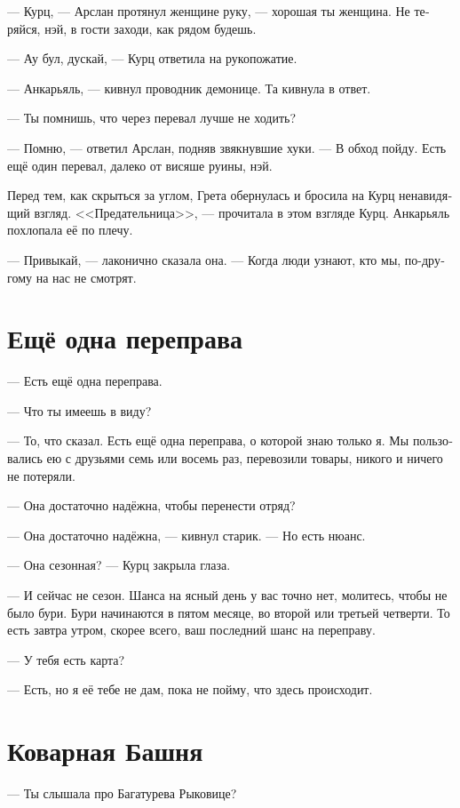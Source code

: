 \documentclass[a4paper,10pt,fleqn]{book}\usepackage{polyglossia}\setdefaultlanguage[babelshorthands=true]{russian}\setotherlanguage{english}\defaultfontfeatures{Ligatures=TeX,Mapping=tex-text}\usepackage{xcolor}\newcommand{\ml}[3]{#2}
\begin{document}
--- Курц, --- Арслан протянул женщине руку, --- хорошая ты женщина.
Не теряйся, нэй, в гости заходи, как рядом будешь.

\ml{$0$}
{--- Ау бул, дускай, --- Курц ответила на рукопожатие.}
{``\textit{Au bul, du\th{}k\ae{},}'' Kurz answered the handshake.}

--- Анкарьяль, --- кивнул проводник демонице.
Та кивнула в ответ.

--- Ты помнишь, что через перевал лучше не ходить?

--- Помню, --- ответил Арслан, подняв звякнувшие хуки.
--- В обход пойду.
Есть ещё один перевал, далеко от висяше руины, нэй.

Перед тем, как скрыться за углом, Грета обернулась и бросила на Курц ненавидящий взгляд.
<<Предательница>>, --- прочитала в этом взгляде Курц.
Анкарьяль похлопала её по плечу.

--- Привыкай, --- лаконично сказала она.
--- Когда люди узнают, кто мы, по-другому на нас не смотрят.

\section{Ещё одна переправа}

--- Есть ещё одна переправа.

--- Что ты имеешь в виду?

--- То, что сказал.
Есть ещё одна переправа, о которой знаю только я.
Мы пользовались ею с друзьями семь или восемь раз, перевозили товары, никого и ничего не потеряли.

--- Она достаточно надёжна, чтобы перенести отряд?

--- Она достаточно надёжна, --- кивнул старик.
--- Но есть нюанс.

--- Она сезонная? --- Курц закрыла глаза.

--- И сейчас не сезон.
Шанса на ясный день у вас точно нет, молитесь, чтобы не было бури.
Бури начинаются в пятом месяце, во второй или третьей четверти.
То есть завтра утром, скорее всего, ваш последний шанс на переправу.

--- У тебя есть карта?

--- Есть, но я её тебе не дам, пока не пойму, что здесь происходит.

\section{Коварная Башня}

--- Ты слышала про Багатурева Рыковице?
\end{document}
